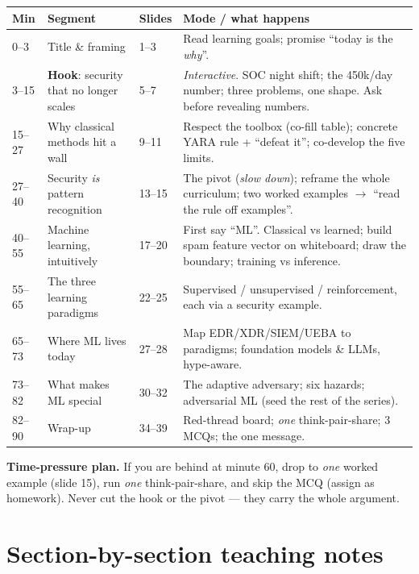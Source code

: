 \documentclass[11pt,a4paper]{article}
\begin{document}
\renewcommand{\arraystretch}{1.25}
\begin{longtable}{@{}p{1.5cm} p{4.3cm} p{2.0cm} p{6.0cm}@{}}
\toprule
\textbf{Min} & \textbf{Segment} & \textbf{Slides} & \textbf{Mode / what happens}\\
\midrule
\endhead
0--3    & Title \& framing              & 1--3   & Read learning goals; promise ``today is the \emph{why}''.\\
3--15   & \textbf{Hook}: security that no longer scales & 5--7 & \emph{Interactive}. SOC night shift; the 450k/day number; three problems, one shape. Ask before revealing numbers.\\
15--27  & Why classical methods hit a wall & 9--11 & Respect the toolbox (co-fill table); concrete YARA rule + ``defeat it''; co-develop the five limits.\\
27--40  & Security \emph{is} pattern recognition & 13--15 & The pivot (\emph{slow down}); reframe the whole curriculum; two worked examples $\to$ ``read the rule off examples''.\\
40--55  & Machine learning, intuitively & 17--20 & First say ``ML''. Classical vs learned; build spam feature vector on whiteboard; draw the boundary; training vs inference.\\
55--65  & The three learning paradigms  & 22--25 & Supervised / unsupervised / reinforcement, each via a security example.\\
65--73  & Where ML lives today          & 27--28 & Map EDR/XDR/SIEM/UEBA to paradigms; foundation models \& LLMs, hype-aware.\\
73--82  & What makes ML special         & 30--32 & The adaptive adversary; six hazards; adversarial ML (seed the rest of the series).\\
82--90  & Wrap-up                       & 34--39 & Red-thread board; \emph{one} think-pair-share; 3 MCQs; the one message.\\
\bottomrule
\end{longtable}

\begin{note}
\textbf{Time-pressure plan.} If you are behind at minute 60, drop to \emph{one}
worked example (slide 15), run \emph{one} think-pair-share, and skip the MCQ
(assign as homework). Never cut the hook or the pivot --- they carry the whole
argument.
\end{note}

\section{Section-by-section teaching notes}
\end{document}
